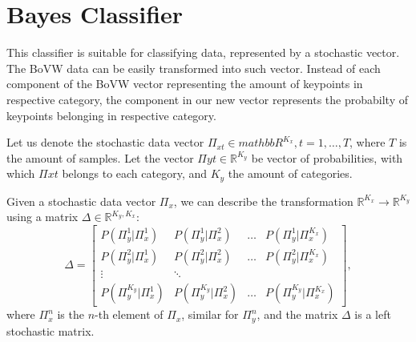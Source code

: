 \section{Bayes Classifier}
This classifier is suitable for classifying data, represented by a stochastic vector. The BoVW data can be easily transformed into such vector. Instead of each component of the BoVW vector representing the amount of keypoints in respective category, the component in our new vector represents the probabilty of keypoints belonging in respective category.

Let us denote the stochastic data vector $\Pi_{xt} \in mathbb{R}^{K_x}, t=1,\dots,T$, where $T$ is the amount of samples. Let the vector $\Pi{yt}\in \mathbb{R}^{K_y}$ be vector of probabilities, with which $\Pi{xt}$ belongs to each category, and $K_y$ the amount of categories.

Given a stochastic data vector $\Pi_x$, we can describe the transformation $\mathbb{R}^{K_x} \rightarrow \mathbb{R}^{K_y}$ using a matrix $\Delta \in \mathbb{R}^{K_y, K_x}$:
\begin{equation}
    \Delta =
    \begin{bmatrix}
        P(\Pi_y^1 | \Pi_x^1) & P(\Pi_y^1 | \Pi_x^2) & \dots & P(\Pi_y^1 | \Pi_x^{K_x})\\
        P(\Pi_y^2 | \Pi_x^1) & P(\Pi_y^2 | \Pi_x^2) & \dots & P(\Pi_y^2 | \Pi_x^{K_x})\\
        \vdots & \ddots\\
        P(\Pi_y^{K_y} | \Pi_x^1) & P(\Pi_y^{K_y} | \Pi_x^2) & \dots & P(\Pi_y^{K_y} | \Pi_x^{K_x})
    \end{bmatrix},
\end{equation}
where $\Pi_x^n$ is the $n$-th element of $\Pi_x$, similar for $\Pi_y^n$, and the matrix $\Delta$ is a left stochastic matrix.

